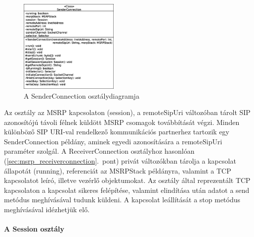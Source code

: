 \begin{figure}
  \vspace{-15pt}
  \begin{center}
    \includegraphics[width=0.43\textwidth]{img/class_diagrams/SenderConnection.eps}
  \end{center}
  \vspace{-15pt}
  \captionsetup{font=scriptsize}
  \caption{A SenderConnection osztálydiagramja}
   \label{fig:class_senderconnection}
  \vspace{-10pt}
\end{figure}
Az osztály az MSRP kapcsolaton (session), a remoteSipUri változóban tárolt SIP azonosítójú távoli félnek küldött MSRP csomagok továbbítását végzi. Minden különböző SIP URI-val rendelkező kommunikációs partnerhez tartozik egy SenderConnection példány, aminek egyedi azonosítására a remoteSipUri paraméter szolgál. A ReceiverConnection osztályhoz hasonlóan (\ref{sec:msrp_receiverconnection}.~pont) privát változókban tárolja a kapcsolat állapotát (running), referenciát az MSRPStack példányra, valamint a TCP kapcsolatot leíró, illetve vezérlő objektumokat. Az osztály által reprezentált TCP kapcsolaton a kapcsolat sikeres felépítése, valamint elindítása után adatot a send metódus meghívásával tudunk küldeni. A kapcsolat leállítását a stop metódus meghívásával idézhetjük elő.

\paragraph{A Session osztály\\}
\label{sec:msrp_session}

